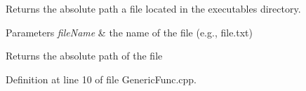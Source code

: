 Returns the absolute path a file located in the executable\textquotesingle{}s directory. 
\begin{DoxyParams}{Parameters}
{\em file\+Name} & the name of the file (e.\+g., file.\+txt) \\
\hline
\end{DoxyParams}
\begin{DoxyReturn}{Returns}
the absolute path of the file 
\end{DoxyReturn}


Definition at line 10 of file Generic\+Func.\+cpp.

